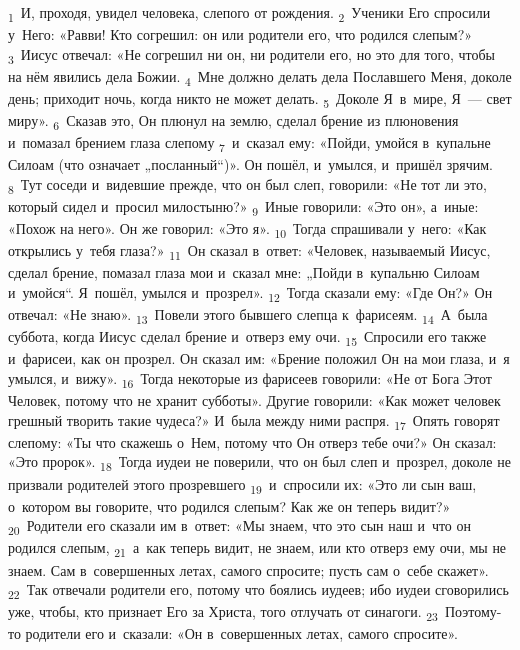 \documentclass[a4paper,12pt]{article}
\begin{document}
\textsubscript{1}~И, проходя, увидел человека, слепого от рождения.
\textsubscript{2}~Ученики Его спросили у~Него: «Равви! Кто согрешил: он или родители его, что родился слепым?»
\textsubscript{3}~Иисус отвечал: «Не согрешил ни он, ни родители его, но это для того, чтобы на нём явились дела Божии.
\textsubscript{4}~Мне должно делать дела Пославшего Меня, доколе день; приходит ночь, когда никто не может делать.
\textsubscript{5}~Доколе Я~в~мире, Я~— свет миру».
\textsubscript{6}~Сказав это, Он плюнул на землю, сделал брение из плюновения и~помазал брением глаза слепому
\textsubscript{7}~и~сказал ему: «Пойди, умойся в~купальне Силоам (что означает „посланный“)». Он пошёл, и~умылся, и~пришёл зрячим.
\textsubscript{8}~Тут соседи и~видевшие прежде, что он был слеп, говорили: «Не тот ли это, который сидел и~просил милостыню?»
\textsubscript{9}~Иные говорили: «Это он», а~иные: «Похож на него». Он же говорил: «Это я».
\textsubscript{10}~Тогда спрашивали у~него: «Как открылись у~тебя глаза?»
\textsubscript{11}~Он сказал в~ответ: «Человек, называемый Иисус, сделал брение, помазал глаза мои и~сказал мне: „Пойди в~купальню Силоам и~умойся“. Я~пошёл, умылся и~прозрел».
\textsubscript{12}~Тогда сказали ему: «Где Он?» Он отвечал: «Не знаю».
\textsubscript{13}~Повели этого бывшего слепца к~фарисеям.
\textsubscript{14}~А~была суббота, когда Иисус сделал брение и~отверз ему очи.
\textsubscript{15}~Спросили его также и~фарисеи, как он прозрел. Он сказал им: «Брение положил Он на мои глаза, и~я умылся, и~вижу».
\textsubscript{16}~Тогда некоторые из фарисеев говорили: «Не от Бога Этот Человек, потому что не хранит субботы». Другие говорили: «Как может человек грешный творить такие чудеса?» И~была между ними распря.
\textsubscript{17}~Опять говорят слепому: «Ты что скажешь о~Нем, потому что Он отверз тебе очи?» Он сказал: «Это пророк».
\textsubscript{18}~Тогда иудеи не поверили, что он был слеп и~прозрел, доколе не призвали родителей этого прозревшего
\textsubscript{19}~и~спросили их: «Это ли сын ваш, о~котором вы говорите, что родился слепым? Как же он теперь видит?»
\textsubscript{20}~Родители его сказали им в~ответ: «Мы знаем, что это сын наш и~что он родился слепым,
\textsubscript{21}~а~как теперь видит, не знаем, или кто отверз ему очи, мы не знаем. Сам в~совершенных летах, самого спросите; пусть сам о~себе скажет».
\textsubscript{22}~Так отвечали родители его, потому что боялись иудеев; ибо иудеи сговорились уже, чтобы, кто признает Его за Христа, того отлучать от синагоги.
\textsubscript{23}~Поэтому-то родители его и~сказали: «Он в~совершенных летах, самого спросите».
\end{document}
